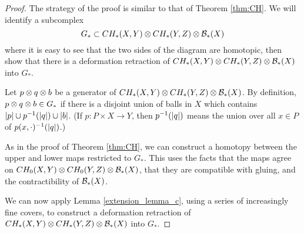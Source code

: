 {\begin{proof}
The strategy of the proof is similar to that of Theorem \ref{thm:CH}.
We will identify a subcomplex 
\[
	G_* \subset CH_*(X, Y) \otimes CH_*(Y, Z) \otimes {\mathcal B}_*(X)
\]
where it is easy to see that the two sides of the diagram are homotopic, then 
show that there is a deformation retraction of $CH_*(X, Y) \otimes CH_*(Y, Z) \otimes {\mathcal B}_*(X)$ into $G_*$.

Let $p\otimes q\otimes b$ be a generator of $CH_*(X, Y) \otimes CH_*(Y, Z) \otimes {\mathcal B}_*(X)$.
By definition, $p\otimes q\otimes b\in G_*$ if there is a disjoint union of balls in $X$ which
contains $|p| \cup p^{-1}(|q|) \cup |b|$.
(If $p:P\times X\to Y$, then $p^{-1}(|q|)$ means the union over all $x\in P$ of 
$p(x, \cdot)^{-1}(|q|)$.)

As in the proof of Theorem \ref{thm:CH}, we can construct a homotopy 
between the upper and lower maps restricted to $G_*$.
This uses the facts that the maps agree on $CH_0(X, Y) \otimes CH_0(Y, Z) \otimes {\mathcal B}_*(X)$,
that they are compatible with gluing, and the contractibility of ${\mathcal B}_*(X)$.

We can now apply Lemma \ref{extension_lemma_c}, using a series of increasingly fine covers, 
to construct a deformation retraction of $CH_*(X, Y) \otimes CH_*(Y, Z) \otimes {\mathcal B}_*(X)$ into $G_*$.
\end{proof}

} %
